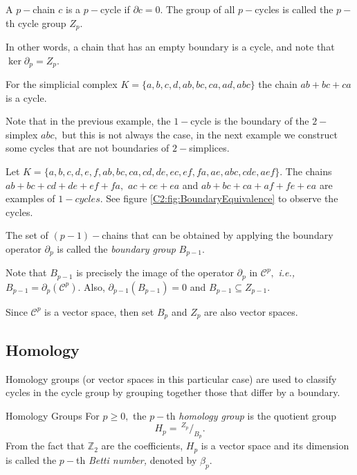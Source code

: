 \documentclass[
	fontsize=10pt, %
	twoside=false, %
	secnumdepth=1, %
]{kaobook}
\newcommand{\Z}{\mathbb{Z}}
\begin{document}
\begin{definition}
    A $p-$chain $c$ is a $p-$cycle if $\partial c=0.$ The group of all $p-$cycles is called the $p-$th cycle group $Z_p.$ 
\end{definition}

In other words, a chain that has an empty boundary is a cycle, and note that $\ker \partial_p= Z_p.$

\begin{example}
    For the simplicial complex $K=\{a,b,c,d, ab, bc, ca, ad, abc\}$ the chain $ab+bc+ca$ is a cycle.
\end{example}

Note that in the previous example, the $1-$cycle is the boundary of the $2-$simplex $abc,$ but this is not always the case, in the next example we construct some cycles that are not boundaries of $2-$simplices.
\begin{example}
    Let $K=\{a,b,c,d,e,f, ab, bc, ca, cd, de, ec, ef, fa, ae, abc, cde, aef\}.$ The chains $ab+bc+cd+de+ef+fa,$ $ac+ce+ea$ and $ab+bc+ca+af+fe+ea$ are examples of $1-cycles.$ See figure \ref{C2:fig:BoundaryEquivalence} to observe the cycles.
\end{example}

\begin{definition}
    The set of $(p-1)-$chains that can be obtained by applying the boundary operator $\partial_p$ is called the \emph{boundary group} $B_{p-1}.$
\end{definition}

\begin{remark}
    Note that $B_{p-1}$ is precisely the image of the operator $\partial_p$ in $\mathcal{C}^p,$ \emph{i.e.,} $B_{p-1}=\partial_p(\mathcal{C}^p).$ Also, $\partial_{p-1}(B_{p-1})=0$ and $B_{p-1}\subseteq Z_{p-1}.$
\end{remark}

Since $\mathcal{C}^p$ is a vector space, then set $B_p$ and $Z_p$ are also vector spaces.


\subsection{Homology}

Homology groups (or vector spaces in this particular case) are used to classify cycles in the cycle group by grouping together those that differ by a boundary.

\begin{definition}{Homology Groups}
    For $p\geq 0,$ the $p-$th \emph{homology group} is the quotient group $$H_p=\,^{Z_p}/_{B_p}.$$ From the fact that $\Z_2$ are the coefficients, $H_p$ is a vector space and its dimension is called the $p-$th \emph{Betti number,} denoted by $\beta_p.$
\end{definition}
\end{document}
